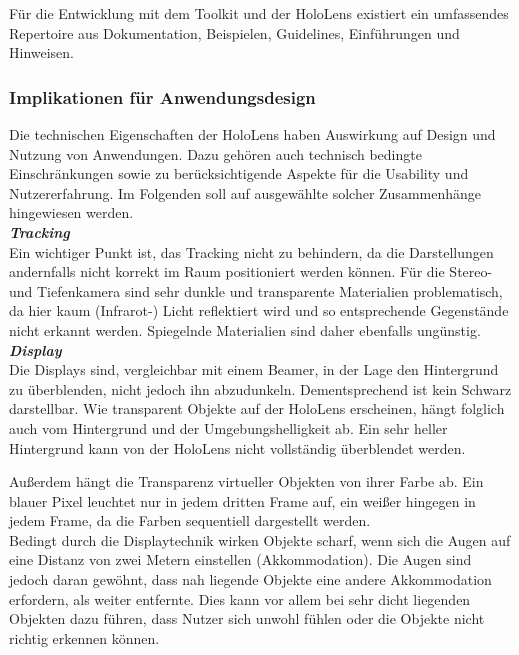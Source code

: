 Für die Entwicklung mit dem Toolkit und der HoloLens existiert ein umfassendes Repertoire aus Dokumentation, Beispielen, Guidelines, Einführungen und Hinweisen.\\


\subsubsection{Implikationen für Anwendungsdesign}
Die technischen Eigenschaften der HoloLens haben Auswirkung auf Design und Nutzung von Anwendungen. Dazu gehören auch technisch bedingte Einschränkungen sowie zu berücksichtigende Aspekte für die Usability und Nutzererfahrung. Im Folgenden soll auf ausgewählte solcher Zusammenhänge hingewiesen werden.\\

\textbf{\textit{Tracking}}\\
Ein wichtiger Punkt ist, das Tracking nicht zu behindern, da die Darstellungen andernfalls nicht korrekt im Raum positioniert werden können. Für die Stereo- und Tiefenkamera sind sehr dunkle und transparente Materialien problematisch, da hier kaum (Infrarot-) Licht reflektiert wird und so entsprechende Gegenstände nicht erkannt werden. Spiegelnde Materialien sind daher ebenfalls ungünstig.\\

\textbf{\textit{Display}}\\
Die Displays sind, vergleichbar mit einem Beamer, in der Lage den Hintergrund zu überblenden, nicht jedoch ihn abzudunkeln. Dementsprechend ist kein Schwarz darstellbar. Wie transparent Objekte auf der HoloLens erscheinen, hängt folglich auch vom Hintergrund und der Umgebungshelligkeit ab. Ein sehr heller Hintergrund kann von der HoloLens nicht vollständig überblendet werden.
\par
\noindent\hspace*{5mm}
Außerdem hängt die Transparenz virtueller Objekten von ihrer Farbe ab. Ein blauer Pixel leuchtet nur in jedem dritten Frame auf, ein weißer hingegen in jedem Frame, da die Farben sequentiell dargestellt werden.\\

Bedingt durch die Displaytechnik wirken Objekte scharf, wenn sich die Augen auf eine Distanz von zwei Metern einstellen (Akkommodation). Die Augen sind jedoch daran gewöhnt, dass nah liegende Objekte eine andere Akkommodation erfordern, als weiter entfernte. Dies kann vor allem bei sehr dicht liegenden Objekten dazu führen, dass Nutzer sich unwohl fühlen oder die Objekte nicht richtig erkennen können.

